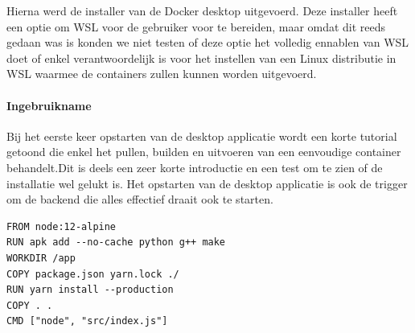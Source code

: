 Hierna werd de installer van de Docker desktop uitgevoerd. Deze installer heeft een optie om WSL voor de gebruiker voor te bereiden, maar omdat dit reeds gedaan was is konden we niet testen of deze optie het volledig ennablen van WSL doet of enkel verantwoordelijk is voor het instellen van een Linux distributie in WSL waarmee de containers zullen kunnen worden uitgevoerd.


\paragraph{Ingebruikname}
Bij het eerste keer opstarten van de desktop applicatie wordt een korte tutorial getoond die enkel het pullen, builden en uitvoeren van een eenvoudige container behandelt.Dit is deels een zeer korte introductie en een test om te zien of de installatie wel gelukt is. Het opstarten van de desktop applicatie is ook de trigger om de backend die alles effectief draait ook te starten.

\begin{lstlisting}[caption=inhoud van de Dockerfile,label=lst:Dockerfile]
FROM node:12-alpine
RUN apk add --no-cache python g++ make
WORKDIR /app
COPY package.json yarn.lock ./
RUN yarn install --production
COPY . .
CMD ["node", "src/index.js"]
\end{lstlisting}


